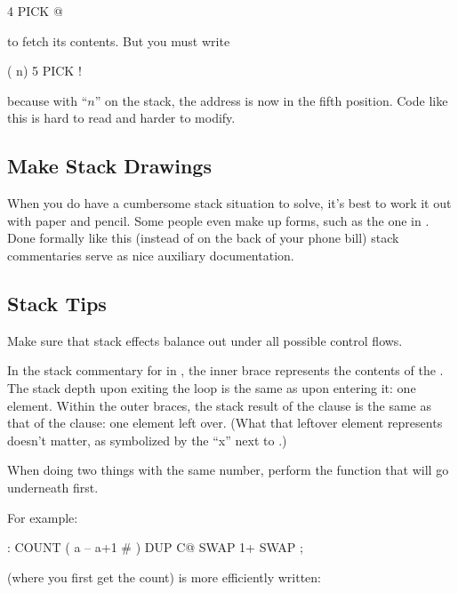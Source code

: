 \begin{Code}
4 PICK @
\end{Code}
to fetch its contents. But you must write

\begin{Code}
( n) 5 PICK !
\end{Code}
because with ``$n$'' on the stack, the address is now in the fifth position.
Code like this is hard to read and harder to modify.%

\subsection{Make Stack Drawings}%

When you do have a cumbersome stack situation to solve, it's best to work
it out with paper and pencil. Some people even make up forms, such as the
one in . Done formally like this (instead of on the back of your
phone bill) stack commentaries serve as nice auxiliary documentation.

\subsection{Stack Tips}

\begin{tip}
Make sure that stack effects balance out under all possible control flows.
\end{tip}
In the stack commentary for  in , the inner brace
represents the contents of the . The stack depth upon exiting
the loop is the same as upon entering it: one element. Within the outer
braces, the stack result of the  clause is the same as that of the
 clause: one element left over. (What that leftover element
represents doesn't matter, as symbolized by the ``x'' next to .)



\begin{tip}
When doing two things with the same number, perform the function that
will go underneath first.
\end{tip}
For example:

\begin{Code}
: COUNT  ( a -- a+1 # )  DUP C@  SWAP 1+  SWAP ;
\end{Code}
(where you first get the count) is more efficiently written:

